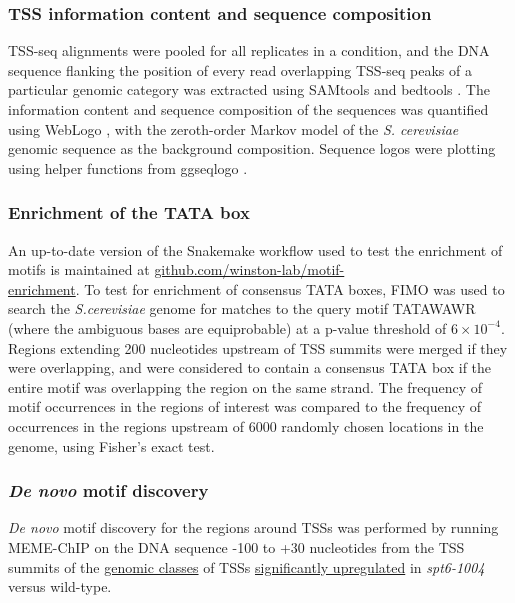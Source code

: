 \subsubsection{TSS information content and sequence composition}
\label{subsubsec:tss_seqlogos}

TSS-seq alignments were pooled for all replicates in a condition, and the DNA sequence flanking the position of every read overlapping TSS-seq peaks of a particular genomic category was extracted using SAMtools \citep{li2009} and bedtools \citep{quinlan2010}.
The information content and sequence composition of the sequences was quantified using WebLogo \citep{crooks2004}, with the zeroth-order Markov model of the \textit{S. cerevisiae} genomic sequence as the background composition.
Sequence logos were plotting using helper functions from ggseqlogo \citep{wagih2017}.

\subsubsection{Enrichment of the TATA box}

An up-to-date version of the Snakemake \citep{koster2012} workflow used to test the enrichment of motifs is maintained at \href{https://github.com/winston-lab/motif-enrichment}{github.com/winston-lab/motif-\\enrichment}.
To test for enrichment of consensus TATA boxes, FIMO \citep{grant2011} was used to search the \textit{S.cerevisiae} genome for matches to the query motif TATAWAWR (where the ambiguous bases are equiprobable) at a p-value threshold of $6 \times 10^{-4}$.
Regions extending 200 nucleotides upstream of TSS summits were merged if they were overlapping, and were considered to contain a consensus TATA box if the entire motif was overlapping the region on the same strand.
The frequency of motif occurrences in the regions of interest was compared to the frequency of occurrences in the regions upstream of 6000 randomly chosen locations in the genome, using Fisher's exact test.

\subsubsection{\textit{De novo} motif discovery}
\label{subsubsec:denovo_motif_discovery}

\textit{De novo} motif discovery for the regions around TSSs was performed by running MEME-ChIP \citep{machanick2011} on the DNA sequence -100 to +30 nucleotides from the TSS summits of the \hyperref[subsubsec:tss_peak_classification]{genomic classes} of TSSs \hyperref[subsubsec:tss_differential_expression]{significantly upregulated} in \textit{spt6-1004} versus wild-type.

